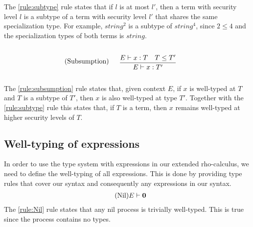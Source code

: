 The \ref{rule:subtype} rule states that if $l$ is at most $l'$, then a term with security level $l$ is a subtype of a term with security level $l'$ that shares the same specialization type.
For example, $string^2$ is a subtype of $string^4$, since $2\leq4$ and the specialization types of both terms is $string$.

\begin{align*}
    \tag{Subsumption}\label{rule:subsumption} &\infrule{E\vdash x:T\quad T\leq T'}{E\vdash x:T'}
\end{align*}

The \ref{rule:subsumption} rule states that, given context $E$, if $x$ is well-typed at $T$ and $T$ is a subtype of $T'$, then $x$ is also well-typed at type $T'$.
Together with the \ref{rule:subtype} rule this states that, if $T$ is a term, then $x$ remains well-typed at higher security levels of $T$.


\subsection{Well-typing of expressions}
In order to use the type system with expressions in our extended rho-calculus, we need to define the well-typing of all expressions.
This is done by providing type rules that cover our syntax and consequently any expressions in our syntax.
\begin{align*}
    \tag{Nil}\label{rule:Nil} &E \vdash \mathbf{0}
\end{align*}
The \ref{rule:Nil} rule states that any nil process is trivially well-typed.
This is true since the process contains no types.

